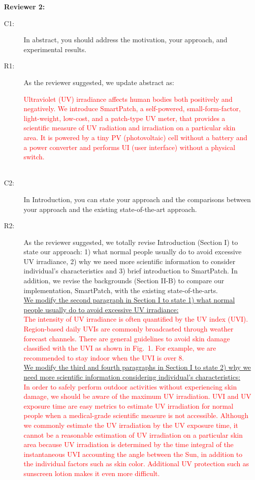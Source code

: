 \documentclass[onecolumn]{IEEEconf}
\begin{document}
\textbf{Reviewer 2:}
\begin{description}
\item [C1: ] In abstract, you should address the motivation, your approach, and experimental results.

\item [R1: ] As the reviewer suggested, we update abstract as:

\textcolor{red}{Ultraviolet (UV) irradiance affects human bodies both positively and negatively. We introduce SmartPatch, a self-powered, small-form-factor, light-weight, low-cost, and a patch-type UV meter, that provides a scientific measure of UV radiation and irradiation on a particular skin area. It is powered by a tiny PV (photovoltaic) cell without a battery and a power converter and performs UI (user interface) without a physical switch.}\\
~\\

\item [C2: ] In Introduction, you can state your approach and the comparisons between your approach and the existing state-of-the-art approach.
\item [R2: ] As the reviewer suggested, we totally revise Introduction (Section I) to state our approach: 1) what normal people usually do to avoid excessive UV irradiance, 2) why we need more scientific information to consider individual's characteristics and 3) brief introduction to SmartPatch. In addition, we revise the backgrounds (Section II-B) to compare our implementation, SmartPatch, with the existing state-of-the-arts.\\

\uline{We modify the second paragraph in Section I to state 1) what normal people usually do to avoid excessive UV irradiance:}\\
%
\textcolor{red}{The intensity of UV irradiance is often quantified by the UV index (UVI). Region-based daily UVIs are commonly broadcasted through weather forecast channels. There are general guidelines to avoid skin damage classified with the UVI as shown in Fig.~1. For example, we are recommended to stay indoor when the UVI  is over 8.}\\

\uline{We modify the third and fourth paragraphs in Section I to state 2) why we need more scientific information considering individual's characteristics:}\\
%
\textcolor{red}{In order to safely perform outdoor activities without experiencing skin damage, we should be aware of  the maximum UV irradiation. UVI and UV exposure time are easy metrics to estimate UV irradiation for normal people when a medical-grade scientific measure is not accessible. Although we commonly estimate the UV irradiation by the UV exposure time, it cannot be a reasonable estimation of UV irradiation on a particular skin area because UV irradiation is determined by the time integral of the instantaneous UVI accounting the angle between the Sun, in addition to the individual factors such as skin color. Additional UV protection such as sunscreen lotion makes it even more difficult.} 


\end{description}
\end{document}
